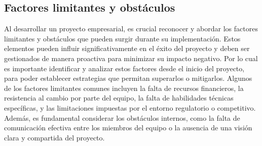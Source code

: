 \subsection{Factores limitantes y obstáculos}
Al desarrollar un proyecto empresarial, es crucial reconocer y abordar los factores limitantes y obstáculos que pueden surgir durante su implementación. Estos elementos pueden influir significativamente en el éxito del proyecto y deben ser gestionados de manera proactiva para minimizar su impacto negativo.
Por lo cual es importante identificar y analizar estos factores desde el inicio del proyecto, para poder establecer estrategias que permitan superarlos o mitigarlos. Algunos de los factores limitantes comunes incluyen la falta de recursos financieros, la resistencia al cambio por parte del equipo, la falta de habilidades técnicas específicas, y las limitaciones impuestas por el entorno regulatorio o competitivo. Además, es fundamental considerar los obstáculos internos, como la falta de comunicación efectiva entre los miembros del equipo o la ausencia de una visión clara y compartida del proyecto.

